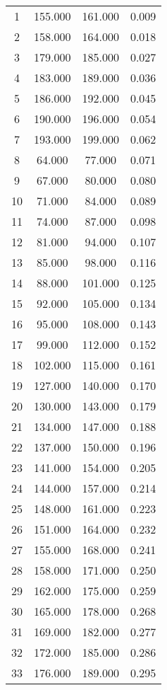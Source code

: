 % 
\begin{tabular}{cccc}
  \hline
  \hline
1 & 155.000 & 161.000 & 0.009 \\ 
  2 & 158.000 & 164.000 & 0.018 \\ 
  3 & 179.000 & 185.000 & 0.027 \\ 
  4 & 183.000 & 189.000 & 0.036 \\ 
  5 & 186.000 & 192.000 & 0.045 \\ 
  6 & 190.000 & 196.000 & 0.054 \\ 
  7 & 193.000 & 199.000 & 0.062 \\ 
  8 & 64.000 & 77.000 & 0.071 \\ 
  9 & 67.000 & 80.000 & 0.080 \\ 
  10 & 71.000 & 84.000 & 0.089 \\ 
  11 & 74.000 & 87.000 & 0.098 \\ 
  12 & 81.000 & 94.000 & 0.107 \\ 
  13 & 85.000 & 98.000 & 0.116 \\ 
  14 & 88.000 & 101.000 & 0.125 \\ 
  15 & 92.000 & 105.000 & 0.134 \\ 
  16 & 95.000 & 108.000 & 0.143 \\ 
  17 & 99.000 & 112.000 & 0.152 \\ 
  18 & 102.000 & 115.000 & 0.161 \\ 
  19 & 127.000 & 140.000 & 0.170 \\ 
  20 & 130.000 & 143.000 & 0.179 \\ 
  21 & 134.000 & 147.000 & 0.188 \\ 
  22 & 137.000 & 150.000 & 0.196 \\ 
  23 & 141.000 & 154.000 & 0.205 \\ 
  24 & 144.000 & 157.000 & 0.214 \\ 
  25 & 148.000 & 161.000 & 0.223 \\ 
  26 & 151.000 & 164.000 & 0.232 \\ 
  27 & 155.000 & 168.000 & 0.241 \\ 
  28 & 158.000 & 171.000 & 0.250 \\ 
  29 & 162.000 & 175.000 & 0.259 \\ 
  30 & 165.000 & 178.000 & 0.268 \\ 
  31 & 169.000 & 182.000 & 0.277 \\ 
  32 & 172.000 & 185.000 & 0.286 \\ 
  33 & 176.000 & 189.000 & 0.295 \\ 

\end{tabular}
